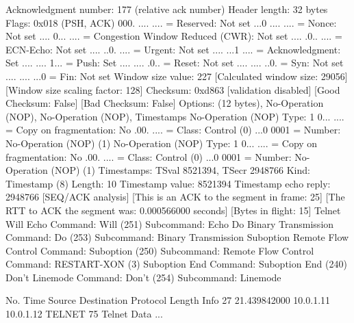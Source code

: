     Acknowledgment number: 177    (relative ack number)
    Header length: 32 bytes
    Flags: 0x018 (PSH, ACK)
        000. .... .... = Reserved: Not set
        ...0 .... .... = Nonce: Not set
        .... 0... .... = Congestion Window Reduced (CWR): Not set
        .... .0.. .... = ECN-Echo: Not set
        .... ..0. .... = Urgent: Not set
        .... ...1 .... = Acknowledgment: Set
        .... .... 1... = Push: Set
        .... .... .0.. = Reset: Not set
        .... .... ..0. = Syn: Not set
        .... .... ...0 = Fin: Not set
    Window size value: 227
    [Calculated window size: 29056]
    [Window size scaling factor: 128]
    Checksum: 0xd863 [validation disabled]
        [Good Checksum: False]
        [Bad Checksum: False]
    Options: (12 bytes), No-Operation (NOP), No-Operation (NOP), Timestamps
        No-Operation (NOP)
            Type: 1
                0... .... = Copy on fragmentation: No
                .00. .... = Class: Control (0)
                ...0 0001 = Number: No-Operation (NOP) (1)
        No-Operation (NOP)
            Type: 1
                0... .... = Copy on fragmentation: No
                .00. .... = Class: Control (0)
                ...0 0001 = Number: No-Operation (NOP) (1)
        Timestamps: TSval 8521394, TSecr 2948766
            Kind: Timestamp (8)
            Length: 10
            Timestamp value: 8521394
            Timestamp echo reply: 2948766
    [SEQ/ACK analysis]
        [This is an ACK to the segment in frame: 25]
        [The RTT to ACK the segment was: 0.000566000 seconds]
        [Bytes in flight: 15]
Telnet
    Will Echo
        Command: Will (251)
        Subcommand: Echo
    Do Binary Transmission
        Command: Do (253)
        Subcommand: Binary Transmission
    Suboption Remote Flow Control
        Command: Suboption (250)
        Subcommand: Remote Flow Control
            Command: RESTART-XON (3)
    Suboption End
        Command: Suboption End (240)
    Don't Linemode
        Command: Don't (254)
        Subcommand: Linemode

No.     Time           Source                Destination           Protocol Length Info
     27 21.439842000   10.0.1.11             10.0.1.12             TELNET   75     Telnet Data ...

